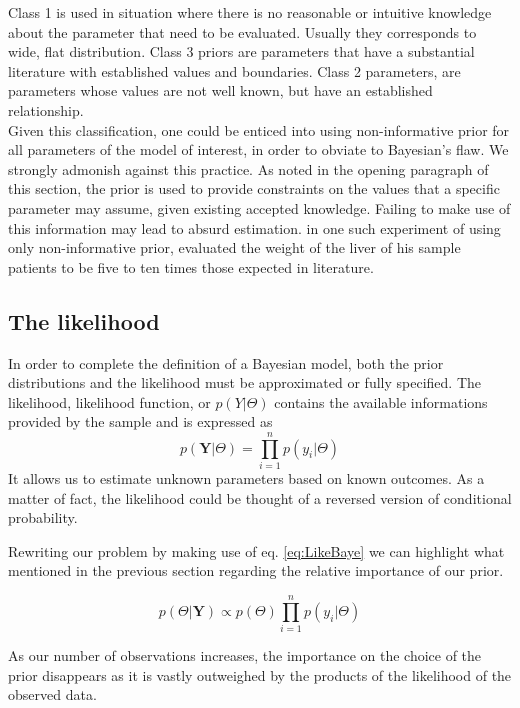 \documentclass[letterpaper]{article}
\begin{document}
	Class 1 is used in situation where there is no reasonable or intuitive knowledge about the parameter that need to be evaluated. Usually they corresponds to wide, flat distribution. Class 3 priors are parameters that have a substantial literature with established values and boundaries. Class 2 parameters, are parameters whose values are not well known, but have an established relationship. \\
	\indent Given this classification, one could be enticed into using non-informative prior for all parameters of the model of interest, in order to obviate to Bayesian's flaw. We strongly admonish against this practice. As noted in the opening paragraph of this section, the prior is used to provide constraints on the values that a specific parameter may assume, given existing accepted knowledge. Failing to make use of this information may lead to absurd estimation. \citet{gelman2002} in one such experiment of using only non-informative prior, evaluated the weight of the liver of his sample patients to be five to ten times those expected in literature.
	
	\subsection{The likelihood}
	In order to complete the definition of a Bayesian model, both the prior distributions and the likelihood must be approximated or fully specified.  The likelihood, likelihood function, or $p(Y|\Theta)$ contains the available informations provided by the sample and is expressed as
	\begin{equation}
	p(\textbf{Y}|\textbf{$\Theta$})=\prod_{i=1}^n p(y_i|\textbf{$\Theta$})
	\label{eq:LikeBaye}
	\end{equation}
	It allows us to estimate unknown parameters based on known outcomes. As a matter of fact, the likelihood could be thought of a reversed version of conditional probability.  
	
	Rewriting our problem by making use of eq. \ref{eq:LikeBaye} we can highlight what mentioned in the previous section regarding the relative importance of our prior.
	
	\begin{equation}
	p(\textbf{$\Theta$}|\textbf{Y}) \propto p(\textbf{$\Theta$})\prod_{i=1}^n p(y_i|\textbf{$\Theta$})
	\label{ref:BayesLikeAndPrior}
	\end{equation}
	
	As our number of observations increases, the importance on the choice of the prior disappears as it is vastly outweighed by the products of the likelihood of the observed data. 
	
\end{document}
